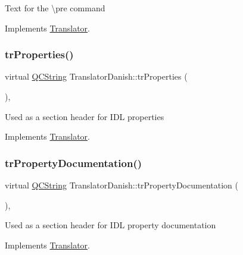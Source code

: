 Text for the \textbackslash{}pre command 

Implements \mbox{\hyperlink{class_translator}{Translator}}.

\mbox{\label{class_translator_danish_a7749a0634f21ba789efddc9fb9d613b5}} 
\subsubsection{\texorpdfstring{trProperties()}{trProperties()}}
{\footnotesize\ttfamily virtual \mbox{\hyperlink{class_q_c_string}{Q\+C\+String}} Translator\+Danish\+::tr\+Properties (\begin{DoxyParamCaption}{ }\end{DoxyParamCaption})\hspace{0.3cm}{\ttfamily [inline]}, {\ttfamily [virtual]}}

Used as a section header for I\+DL properties 

Implements \mbox{\hyperlink{class_translator}{Translator}}.

\mbox{\label{class_translator_danish_a21fc47378317f9f588d71d59192f8747}} 
\subsubsection{\texorpdfstring{trPropertyDocumentation()}{trPropertyDocumentation()}}
{\footnotesize\ttfamily virtual \mbox{\hyperlink{class_q_c_string}{Q\+C\+String}} Translator\+Danish\+::tr\+Property\+Documentation (\begin{DoxyParamCaption}{ }\end{DoxyParamCaption})\hspace{0.3cm}{\ttfamily [inline]}, {\ttfamily [virtual]}}

Used as a section header for I\+DL property documentation 

Implements \mbox{\hyperlink{class_translator}{Translator}}.

\mbox{\label{class_translator_danish_a3ae1dcfc2b5aef387244c5a1af96596d}} 
